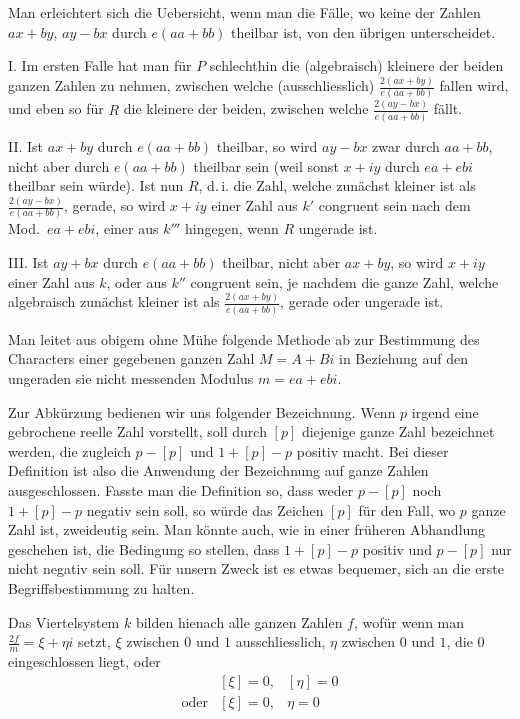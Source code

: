 Man erleichtert sich die Uebersicht, wenn man die Fälle, wo keine der Zahlen $ax+by$, $ay-bx$ durch $e(aa+bb)$ theilbar ist, von den übrigen unterscheidet.

I. Im ersten Falle hat man für $P$ schlechthin die (algebraisch) kleinere der beiden ganzen Zahlen zu nehmen, zwischen welche (ausschliesslich) $\frac{2(ax+by)}{e(aa+bb)}$ fallen wird, und eben so für $R$ die kleinere der beiden, zwischen welche $\frac{2(ay-bx)}{e(aa+bb)}$ fällt.

II. Ist $ax+by$ durch $e(aa+bb)$ theilbar, so wird $ay-bx$ zwar durch $aa+bb$, nicht aber durch $e(aa+bb)$ theilbar sein (weil sonst $x+iy$ durch $ea+ebi$ theilbar sein würde). Ist nun $R$, d.\,i. die Zahl, welche zunächst kleiner ist als $\frac{2(ay-bx)}{e(aa+bb)}$, gerade, so wird $x+iy$ einer Zahl aus $k'$ congruent sein nach dem Mod.\ $ea+ebi$, einer aus $k'''$ hingegen, wenn $R$ ungerade ist.

III. Ist $ay+bx$ durch $e(aa+bb)$ theilbar, nicht aber $ax+by$, so wird $x+iy$ einer Zahl aus $k$, oder aus $k''$ congruent sein, je nachdem die ganze Zahl, welche algebraisch zunächst kleiner ist als $\frac{2(ax+by)}{e(aa+bb)}$, gerade oder ungerade ist.


Man leitet aus obigem ohne Mühe folgende Methode ab zur Bestimmung des Characters einer gegebenen ganzen Zahl $M=A+Bi$ in Beziehung auf den ungeraden sie nicht messenden Modulus $m=ea+ebi$.

Zur Abkürzung bedienen wir uns folgender Bezeichnung. Wenn $p$ irgend eine gebrochene reelle Zahl vorstellt, soll durch $[p]$ diejenige ganze Zahl bezeichnet werden, die zugleich $p-[p]$ und $1+[p]-p$ positiv macht. Bei dieser Definition ist also die Anwendung der Bezeichnung auf ganze Zahlen ausgeschlossen. Fasste man die Definition so, dass weder $p-[p]$ noch $1+[p]-p$ negativ sein soll, so würde das Zeichen $[p]$ für den Fall, wo $p$ ganze Zahl ist, zweideutig sein. Man könnte auch, wie in einer früheren Abhandlung geschehen ist, die Bedingung so stellen, dass $1+[p]-p$ positiv und $p-[p]$ nur nicht negativ sein soll. Für unsern Zweck ist es etwas bequemer, sich an die erste Begriffsbestimmung zu halten.

Das Viertelsystem $k$ bilden hienach alle ganzen Zahlen $f$, wofür wenn man $\frac{2f}{m}=\xi+\eta i$ setzt, $\xi$ zwischen $0$ und $1$ ausschliesslich, $\eta$ zwischen $0$ und $1$, die $0$ eingeschlossen liegt, oder
\[
\begin{array}{lll}
&[\xi]=0,&[\eta]=0\\
\text{oder}&[\xi]=0,&\eta=0
\end{array}
\]

